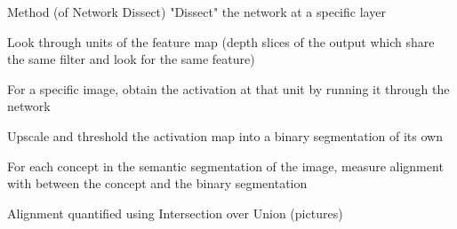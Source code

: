 \documentclass{beamer}
\begin{document}
\begin{frame}{Method (of Network Dissect)}%
"Dissect" the network at a specific layer

Look through units of the feature map (depth slices of the output which share the same filter and look for the same feature)

For a specific image, obtain the activation at that unit by running it through the network

Upscale and threshold the activation map into a binary segmentation of its own

For each concept in the semantic segmentation of the image, measure alignment with between the concept and the binary segmentation
\end{frame}

\begin{frame}
Alignment quantified using Intersection over Union (pictures)
\end{frame}
\end{document}
